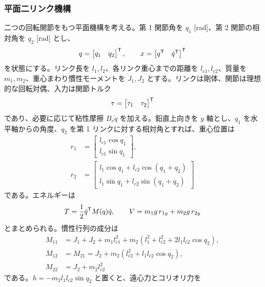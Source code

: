\subsubsection{平面二リンク機構}

二つの回転関節をもつ平面機構を考える。第 1 関節角を $q_1$ [rad]、第 2 関節の相対角を $q_2$ [rad] とし、
\begin{equation}
  q=
  \begin{bmatrix}
    q_1&q_2
  \end{bmatrix}^{\mathsf{T}},
  \qquad
  x=
  \begin{bmatrix}
    q^{\mathsf{T}}&\dot{q}^{\mathsf{T}}
  \end{bmatrix}^{\mathsf{T}}
\end{equation}
を状態にする。リンク長を $l_1,l_2$、各リンク重心までの距離を $l_{c1},l_{c2}$、質量を $m_1,m_2$、重心まわり慣性モーメントを $J_1,J_2$ とする。リンクは剛体、関節は理想的な回転対偶、入力は関節トルク
\begin{equation}
  \tau=
  \begin{bmatrix}
    \tau_1&\tau_2
  \end{bmatrix}^{\mathsf{T}}
\end{equation}
であり、必要に応じて粘性摩擦 $B_v\dot{q}$ を加える。鉛直上向きを $y$ 軸とし、$q_1$ を水平軸からの角度、$q_2$ を第 1 リンクに対する相対角とすれば、重心位置は
\begin{align}
  r_1&=
  \begin{bmatrix}
    l_{c1}\cos q_1\\
    l_{c1}\sin q_1
  \end{bmatrix},\\
  r_2&=
  \begin{bmatrix}
    l_1\cos q_1+l_{c2}\cos(q_1+q_2)\\
    l_1\sin q_1+l_{c2}\sin(q_1+q_2)
  \end{bmatrix}
\end{align}
である。エネルギーは
\begin{equation}
  T=\frac{1}{2}\dot{q}^{\mathsf{T}} M(q)\dot{q},
  \qquad
  V=m_1g\,r_{1y}+m_2g\,r_{2y}
\end{equation}
とまとめられる。慣性行列の成分は
\begin{align}
  M_{11}
  &=J_1+J_2+m_1l_{c1}^2
    +m_2\left(l_1^2+l_{c2}^2+2l_1l_{c2}\cos q_2\right),\\
  M_{12}
  &=M_{21}
  =J_2+m_2\left(l_{c2}^2+l_1l_{c2}\cos q_2\right),\\
  M_{22}
  &=J_2+m_2l_{c2}^2
\end{align}
である。$h=-m_2l_1l_{c2}\sin q_2$ と置くと、遠心力とコリオリ力を
